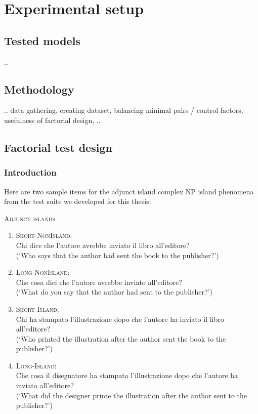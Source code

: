 \chapter{Experimental setup}


\section{Tested models}
..

\section{Methodology}
..
data gathering, creating dataset, balancing minimal pairs / control factors, usefulness of factorial design, ..

\section{Factorial test design}

\subsection{Introduction}

Here are two sample items for the adjunct island complex NP island phenomena from the test suite we developed for this thesis:

\begin{example}
	\textsc{Adjunct islands}
	\renewcommand{\labelenumi}{\alph{enumi}.}
	\begin{enumerate}
		\item \textsc{Short-NonIsland:} \\
		Chi dice che l’autore avrebbe inviato il libro all’editore? \\
		(`Who says that the author had sent the book to the publisher?')
		\item \textsc{Long-NonIsland:} \\
		Che cosa dici che l'autore avrebbe inviato all’editore? \\
		(`What do you say that the author had sent to the publisher?')
		\item \textsc{Short-Island:} \\
		Chi ha stampato l’illustrazione dopo che l'autore ha inviato il libro all’editore? \\
		(`Who printed the illustration after the author sent the book to the publisher?')
		\item \textsc{Long-Island:} \\				
		Che cosa il disegnatore ha stampato l’illustrazione dopo che l'autore ha inviato all’editore? \\
		(`What did the designer printe the illustration after the author sent to the publisher?')
	\end{enumerate}
	\label{adjunct_item_1}
\end{example}


